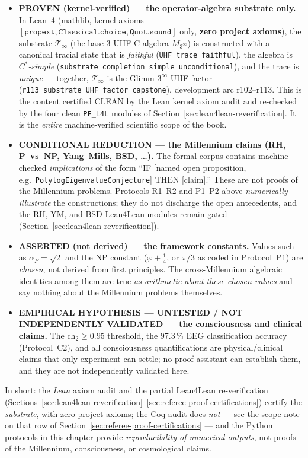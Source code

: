 \begin{itemize}
\item \textbf{PROVEN (kernel-verified) --- the operator-algebra substrate only.} In Lean~4 (mathlib, kernel axioms $[\texttt{propext}, \texttt{Classical.choice}, \texttt{Quot.sound}]$ only, \textbf{zero project axioms}), the substrate $\mathcal{T}_\infty$ (the base-3 UHF C\*-algebra $M_{3^\infty}$) is constructed with a canonical tracial state that is \emph{faithful} (\texttt{UHF\_trace\_faithful}), the algebra is \emph{$C^*$-simple} (\texttt{substrate\_completion\_simple\_unconditional}), and the trace is \emph{unique} --- together, $\mathcal{T}_\infty$ is the Glimm $3^\infty$ UHF factor (\texttt{r113\_substrate\_UHF\_factor\_capstone}), development arc r102--r113. This is the content certified CLEAN by the Lean kernel axiom audit and re-checked by the four clean \texttt{PF\_L4L} modules of Section~\ref{sec:lean4lean-reverification}. It is the \emph{entire} machine-verified scientific scope of the book.
\item \textbf{CONDITIONAL REDUCTION --- the Millennium claims (RH, P~vs~NP, Yang--Mills, BSD, \ldots).} The formal corpus contains machine-checked \emph{implications} of the form ``IF [named open proposition, e.g.\ \texttt{PolylogEigenvalueConjecture}] THEN [claim].'' These are not proofs of the Millennium problems. Protocols R1--R2 and P1--P2 above \emph{numerically illustrate} the constructions; they do not discharge the open antecedents, and the RH, YM, and BSD Lean4Lean modules remain gated (Section~\ref{sec:lean4lean-reverification}).
\item \textbf{ASSERTED (not derived) --- the framework constants.} Values such as $\alpha_P=\sqrt2$ and the NP constant ($\varphi+\tfrac14$, or $\pi/3$ as coded in Protocol~P1) are \emph{chosen}, not derived from first principles. The cross-Millennium algebraic identities among them are true \emph{as arithmetic about these chosen values} and say nothing about the Millennium problems themselves.
\item \textbf{EMPIRICAL HYPOTHESIS --- UNTESTED / NOT INDEPENDENTLY VALIDATED --- the consciousness and clinical claims.} The $\text{ch}_2\!\geq\!0.95$ threshold, the 97.3\,\% EEG classification accuracy (Protocol~C2), and all consciousness quantifications are physical/clinical claims that only experiment can settle; no proof assistant can establish them, and they are not independently validated here.
\end{itemize}
\noindent In short: the \emph{Lean} axiom audit and the partial Lean4Lean re-verification (Sections~\ref{sec:lean4lean-reverification}--\ref{sec:referee-proof-certifications}) certify the \emph{substrate}, with zero project axioms; the Coq audit does \emph{not} --- see the scope note on that row of Section~\ref{sec:referee-proof-certifications} --- and the Python protocols in this chapter provide \emph{reproducibility of numerical outputs}, not proofs of the Millennium, consciousness, or cosmological claims.

